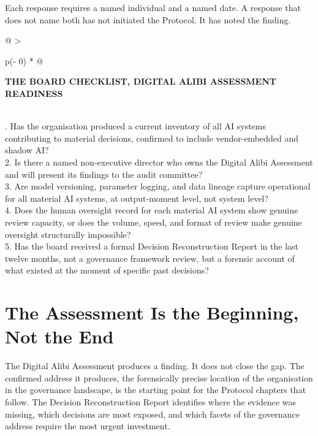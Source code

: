 Each response requires a named individual and a named date. A response that does not name both has not initiated the Protocol. It has noted the finding.

\begin{longtable}[]{@{}
  >{\raggedright\arraybackslash}p{(\columnwidth - 0\tabcolsep) * }@{}}
\toprule\noalign{}
\begin{minipage}[b]{\linewidth}\raggedright
\textbf{THE BOARD CHECKLIST, DIGITAL ALIBI ASSESSMENT READINESS}
\end{minipage} \\
\midrule\noalign{}
\endhead
\bottomrule\noalign{}
. Has the organisation produced a current inventory of all AI systems contributing to material decisions, confirmed to include vendor-embedded and shadow AI? \\
2. Is there a named non-executive director who owns the Digital Alibi Assessment and will present its findings to the audit committee? \\
3. Are model versioning, parameter logging, and data lineage capture operational for all material AI systems, at output-moment level, not system level? \\
4. Does the human oversight record for each material AI system show genuine review capacity, or does the volume, speed, and format of review make genuine oversight structurally impossible? \\
5. Has the board received a formal Decision Reconstruction Report in the last twelve months, not a governance framework review, but a forensic account of what existed at the moment of specific past decisions? \\
\end{longtable}

\scenebreak

\section{The Assessment Is the Beginning, Not the End}

The Digital Alibi Assessment produces a finding. It does not close the gap. The confirmed address it produces, the forensically precise location of the organisation in the governance landscape, is the starting point for the Protocol chapters that follow. The Decision Reconstruction Report identifies where the evidence was missing, which decisions are most exposed, and which facets of the governance address require the most urgent investment.

